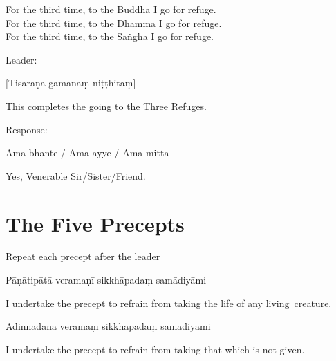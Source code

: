\begin{english}
  For the third time, to the Buddha I go for refuge.\\
  For the third time, to the Dhamma I go for refuge.\\
  For the third time, to the Saṅgha I go for refuge.
\end{english}

\begin{instruction}
  Leader:
\end{instruction}

[Tisaraṇa-gamanaṃ niṭṭhitaṃ]

\begin{english}
  This completes the going to the Three Refuges.
\end{english}

\begin{instruction}
  Response:
\end{instruction}

Āma bhante / Āma ayye / Āma mitta

\begin{english}
  Yes, Venerable Sir/Sister/Friend.
\end{english}

\chapter{The Five Precepts}

\begin{instruction}
  Repeat each precept after the leader
\end{instruction}

\begin{precept}
  \setcounter{enumi}{0}
  \item Pāṇātipātā veramaṇī sikkhāpadaṃ samādiyāmi
\end{precept}

\begin{english}
  I undertake the precept to refrain from taking the life of any living~creature.
\end{english}

\begin{precept}
  \setcounter{enumi}{1}
  \item Adinnādānā veramaṇī sikkhāpadaṃ samādiyāmi
\end{precept}

\begin{english}
  I undertake the precept to refrain from taking that which is not given.
\end{english}

